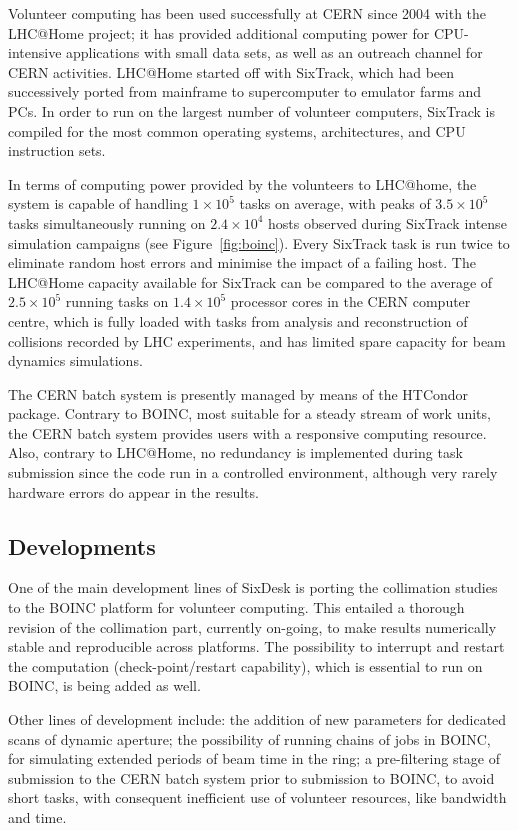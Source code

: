 \documentclass[a4paper,
              ]{jacow}
\begin{document}
Volunteer computing has been used successfully at CERN since 2004 with the LHC@Home project; it has provided additional computing power for CPU-intensive applications with small data sets, as well as an outreach channel for CERN activities. LHC@Home started off with SixTrack, which had been successively ported from mainframe to supercomputer to emulator farms and PCs. In order to run on the largest number of volunteer computers, SixTrack is compiled for the most common operating systems, architectures, and CPU instruction sets.

In terms of computing power provided by the volunteers to LHC@home, the system is capable of handling $1\times 10^5$ tasks on average, with peaks of $3.5 \times 10^5$ tasks simultaneously running on $2.4 \times 10^4$ hosts observed during SixTrack intense simulation campaigns (see Figure~\ref{fig:boinc}). Every SixTrack task is run twice to eliminate random host errors and minimise the impact of a failing host. The LHC@Home capacity available for SixTrack can be compared to the average of $2.5 \times 10^5$ running tasks on $1.4 \times 10^5$ processor cores in the CERN computer centre, which is fully loaded with tasks from analysis and reconstruction of collisions recorded by LHC experiments, and has limited spare capacity for beam dynamics simulations.

The CERN batch system is presently managed by means of the HTCondor~\cite{HTCondor} package. Contrary to BOINC, most suitable for a steady stream of work units, the CERN batch system provides users with a responsive computing resource. Also, contrary to LHC@Home, no redundancy is implemented during task submission since the code run in a controlled environment, although very rarely hardware errors do appear in the results.

\subsection{Developments}

One of the main development lines of SixDesk is porting the collimation studies to the BOINC platform for volunteer computing. This entailed a thorough revision of the collimation part, currently on-going, to make results numerically stable and reproducible across platforms. The possibility to interrupt and restart the computation (check-point/restart capability), which is essential to run on BOINC,  is being added as well.

Other lines of development include: the addition of new parameters for dedicated scans of dynamic aperture; the possibility of running chains of jobs in BOINC, for simulating extended periods of beam time in the ring; a pre-filtering stage of submission to the CERN batch system prior to submission to BOINC, to avoid short tasks, with consequent inefficient use of volunteer resources, like bandwidth and time.
\end{document}
